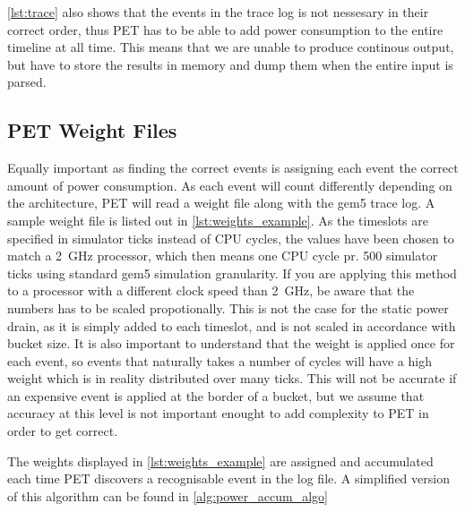 \autoref{lst:trace} also shows that the events in the trace log is not nessesary in their
correct order, thus PET has to be able to add power consumption to the entire timeline at all
time. This means that we are unable to produce continous output, but have to store the
results in memory and dump them when the entire input is parsed.


\subsection{PET Weight Files}
Equally important as finding the correct events is assigning each event the
correct amount of power consumption. As each event will count differently
depending on the architecture, PET will read a weight file along with the gem5
trace log. A sample weight file is listed out in \autoref{lst:weights_example}.
As the timeslots are specified in simulator ticks instead of CPU cycles, the
values have been chosen to match a 2~GHz processor, which then means one CPU
cycle pr. 500 simulator ticks using standard gem5 simulation granularity.  If
you are applying this method to a processor with a different clock speed than
2~GHz, be aware that the numbers has to be scaled propotionally. This is not the
case for the static power drain, as it is simply added to each timeslot, and is
not scaled in accordance with bucket size. It is also important to understand
that the weight is applied once for each event, so events that naturally takes a
number of cycles will have a high weight which is in reality distributed over
many ticks. This will not be accurate if an expensive event is applied at the
border of a bucket, but we assume that accuracy at this level is not important
enought to add complexity to PET in order to get correct.



The weights displayed in \autoref{lst:weights_example} are assigned and
accumulated each time PET discovers a recognisable event in the log file. A
simplified version of this algorithm can be found in
\autoref{alg:power_accum_algo}

